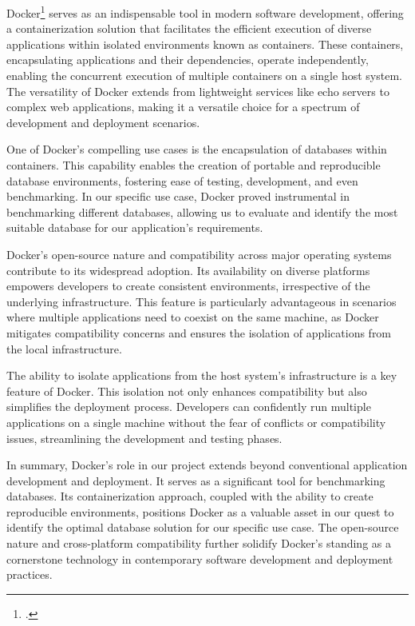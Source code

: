 Docker\footcite{docker} serves as an indispensable tool in modern software development, offering a containerization solution that facilitates the efficient 
execution of diverse applications within isolated environments known as containers. These containers, encapsulating applications and their dependencies, operate 
independently, enabling the concurrent execution of multiple containers on a single host system. The versatility of Docker extends from lightweight services 
like echo servers to complex web applications, making it a versatile choice for a spectrum of development and deployment scenarios.\newline

One of Docker's compelling use cases is the encapsulation of databases within containers. This capability enables the creation of portable and reproducible 
database environments, fostering ease of testing, development, and even benchmarking. In our specific use case, Docker proved instrumental in benchmarking 
different databases, allowing us to evaluate and identify the most suitable database for our application's requirements.\newline

Docker's open-source nature and compatibility across major operating systems contribute to its widespread adoption. Its availability on diverse platforms 
empowers developers to create consistent environments, irrespective of the underlying infrastructure. This feature is particularly advantageous in scenarios 
where multiple applications need to coexist on the same machine, as Docker mitigates compatibility concerns and ensures the isolation of applications from the 
local infrastructure.\newline

The ability to isolate applications from the host system's infrastructure is a key feature of Docker. This isolation not only enhances compatibility but also 
simplifies the deployment process. Developers can confidently run multiple applications on a single machine without the fear of conflicts or compatibility 
issues, streamlining the development and testing phases.\newline

In summary, Docker's role in our project extends beyond conventional application development and deployment. It serves as a significant tool for benchmarking 
databases. Its containerization approach, coupled with the ability to create reproducible environments, positions Docker as a valuable asset in our quest to 
identify the optimal database solution for our specific use case. The open-source nature and cross-platform compatibility further solidify Docker's standing as 
a cornerstone technology in contemporary software development and deployment practices.


